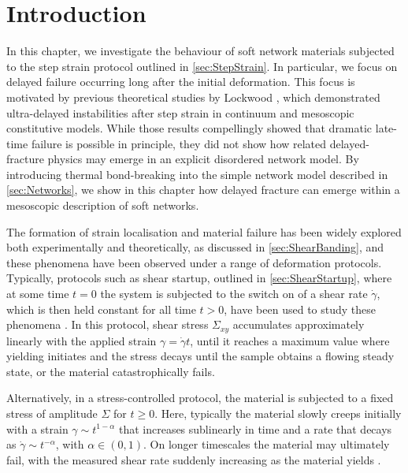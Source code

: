 \documentclass[asymmetricmargins]{library/duthesis}%
\begin{document}
\section{Introduction} \label{sec:delayedInto}
In this chapter, we investigate the behaviour of soft network materials subjected to the step strain protocol outlined in \cref{sec:StepStrain}. In particular, we focus on delayed failure occurring long after the initial deformation. This focus is motivated by previous theoretical studies by Lockwood \etal\cite{lockwood_ultradelayed_2025}, which demonstrated ultra-delayed instabilities after step strain in continuum and mesoscopic constitutive models. While those results compellingly showed that dramatic late-time failure is possible in principle, they did not show how related delayed-fracture physics may emerge in an explicit disordered network model. By introducing thermal bond-breaking into the simple network model described in \cref{sec:Networks}, we show in this chapter how delayed fracture can emerge within a mesoscopic description of soft networks.

The formation of strain localisation and material failure has been widely explored both experimentally and theoretically, as discussed in \cref{sec:ShearBanding}, and these phenomena have been observed under a range of deformation protocols. Typically, protocols such as shear startup, outlined in \cref{sec:ShearStartup}, where at some time $t=0$ the system is subjected to the switch on of a shear rate $\dot{\gamma}$, which is then held constant for all time $t>0$, have been used to study these phenomena \cite{moorcroft_shear_2014,moorcroft_criteria_2013,pollard_yielding_2022,moorcroft_age-dependent_2011,divouxTransientShearBanding2010,divoux_stress_2011,kurokawa_avalanche-like_2015}. In this protocol, shear stress $\Sigma_{xy}$ accumulates approximately linearly with the applied strain $\gamma = \dot{\gamma}t$, until it reaches a maximum value where yielding initiates and the stress decays until the sample obtains a flowing steady state, or the material catastrophically fails. 

Alternatively, in a stress-controlled protocol, the material is subjected to a fixed stress of amplitude $\Sigma$ for $t \geq 0$. Here, typically the material slowly creeps initially with a strain $\gamma \sim t^{1-\alpha}$ that increases sublinearly in time and a rate that decays as $\dot{\gamma} \sim t^{-\alpha}$, with $\alpha \in \left( 0,1 \right)$. On longer timescales the material may ultimately fail, with the measured shear rate suddenly increasing as the material yields \cite{miguel_dislocation_2002,gibaud_heterogeneous_2010,leocmach_creep_2014,ballesta_creep_2016,liuCreepDynamicsAthermal2018,cabriolu_precursors_2019,siebenburger_creep_2012}.
\end{document}
